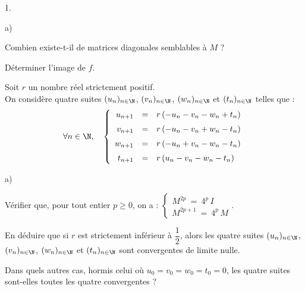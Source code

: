 \documentclass[11pt]{article}%
\begin{document}
\begin{exerciceAP}
\begin{noliste}{1.}
\begin{noliste}{a)}
    \item Combien existe-t-il de matrices diagonales semblables à $M$
      ?
      
    \item Déterminer l'image de $f$.
    \end{noliste}
    
  \item Soit $r$ un nombre réel strictement positif.\\
    On considère quatre suites $(u_n)_{n \in \N}$, $(v_n)_{n \in \N}$,
    $(w_n)_{n \in \N}$ et $(t_n)_{n \in \N}$ telles que :
    \[
      \forall n \in \N, \quad \left\{
        \begin{array}{rcl}
          u_{n+1} & = & r \, (-u_n-v_n-w_n+t_n)
          \\[.2cm]
          v_{n+1} & = & r \, (-u_n-v_n +w_n-t_n)
          \\[.2cm]
          w_{n+1} & = & r \, (-u_n +v_n -w_n -t_n)
          \\[.2cm]
          t_{n+1} & = & r \, (u_n -v_n -w_n -t_n)
        \end{array}
      \right.
    \]
    \begin{noliste}{a)}
    \item Vérifier que, pour tout entier $p \geq 0$, on a : $\left\{
        \begin{array}{l}
          M^{2p} \ = \ 4^p \, I
          \\[.2cm]
          M^{2p+1} \ = \ 4^p \, M
        \end{array}
      \right.$.
      
    \item En déduire que si $r$ est strictement inférieur à
      $\dfrac{1}{2}$, alors les quatre suites $(u_n)_{n \in \N}$,
      $(v_n)_{n \in \N}$, $(w_n)_{n \in \N}$ et $(t_n)_{n \in \N}$
      sont convergentes de limite nulle.
      
    \item Dans quels autres cas, hormis celui où $u_0 = v_0 = w_0 =
      t_0 = 0$, les quatre suites sont-elles toutes les quatre
      convergentes ?
    \end{noliste}
  \end{noliste}
\end{exerciceAP}
\end{document}
